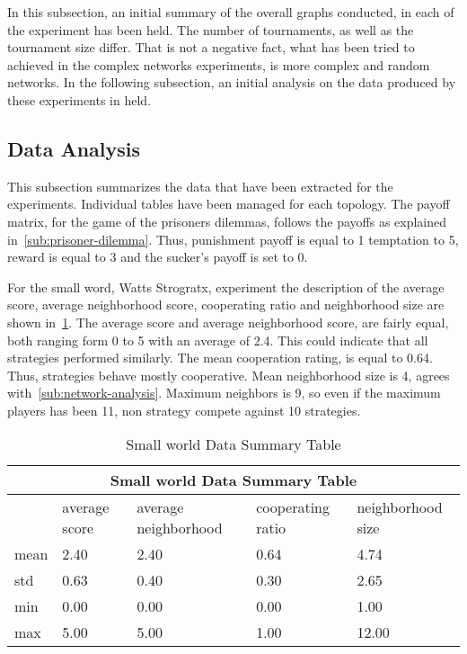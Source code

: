 In this subsection, an initial summary of the overall graphs conducted, in
each of the experiment has been held. The number of tournaments, as well as the
tournament size differ. That is not a negative fact, what has been tried to
achieved in the complex networks experiments, is more complex and random
networks. In the following subsection, an initial analysis on the data produced
by these experiments in held.

\subsection{Data Analysis}

This subsection summarizes the data that have been extracted for the experiments.
Individual tables have been managed for each topology. The payoff matrix, for
the game of the prisoners dilemmas, follows the payoffs as explained in~\ref{sub:prisoner-dilemma}.
Thus, punishment payoff is equal to 1 temptation to 5, reward is equal to 3 and
the sucker's payoff is set to 0.

For the small word, Watts Strogratx, experiment the description of the
average score, average neighborhood score, cooperating ratio and neighborhood
size are shown in~\ref{summary-small-data}. The average score and average
neighborhood score, are fairly equal, both ranging form 0 to 5 with an average of
2.4. This could indicate that all strategies performed similarly. The mean
cooperation rating, is equal to 0.64. Thus, strategies behave mostly cooperative.
Mean neighborhood size is 4, agrees with~\ref{sub:network-analysis}.
Maximum neighbors is 9, so even if the maximum players has been 11, non strategy
compete against 10 strategies.

\begin{table}[!hbtp]
	\centering
	\begin{adjustbox}{width=0.8\textwidth}
		\small
		\begin{tabular}{|l|l|l|l|l|}
			\hline
			\multicolumn{5}{|c|}{Small world Data Summary Table}                                \\ \hline
			     & average score & average neighborhood & cooperating ratio & neighborhood size \\ \hline
			mean & 2.40          & 2.40                 & 0.64              & 4.74              \\ \hline
			std  & 0.63          & 0.40                 & 0.30              & 2.65              \\ \hline
			min  & 0.00          & 0.00                 & 0.00              & 1.00              \\ \hline
			max  & 5.00          & 5.00                 & 1.00              & 12.00             \\ \hline
		\end{tabular}
	\end{adjustbox}
	\caption{Small world Data Summary Table}
	\label{summary-small-data}
\end{table}

